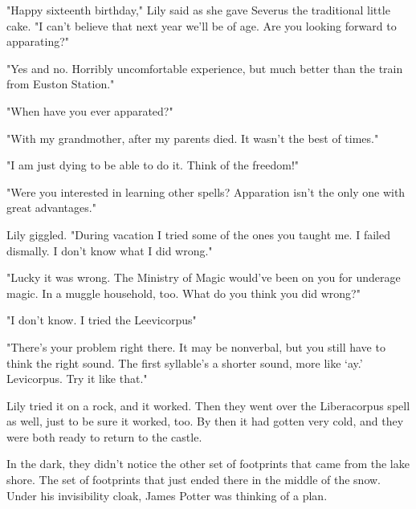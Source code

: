 "Happy sixteenth birthday," Lily said as she gave Severus the traditional little cake. "I can't believe that next year we'll be of age. Are you looking forward to apparating?"

"Yes and no. Horribly uncomfortable experience, but much better than the train from Euston Station."

"When have you ever apparated?"

"With my grandmother, after my parents died. It wasn't the best of times."

"I am just dying to be able to do it. Think of the freedom!"

"Were you interested in learning other spells? Apparation isn't the only one with great advantages."

Lily giggled. "During vacation I tried some of the ones you taught me. I failed dismally. I don't know what I did wrong."

"Lucky it was wrong. The Ministry of Magic would've been on you for underage magic. In a muggle household, too. What do you think you did wrong?"

"I don't know. I tried the Leevicorpus{\el}"

"There's your problem right there. It may be nonverbal, but you still have to think the right sound. The first syllable's a shorter sound, more like `ay.' Levicorpus. Try it like that."

Lily tried it on a rock, and it worked. Then they went over the Liberacorpus spell as well, just to be sure it worked, too. By then it had gotten very cold, and they were both ready to return to the castle.

In the dark, they didn't notice the other set of footprints that came from the lake shore. The set of footprints that just ended there in the middle of the snow. Under his invisibility cloak, James Potter was thinking of a plan. 


